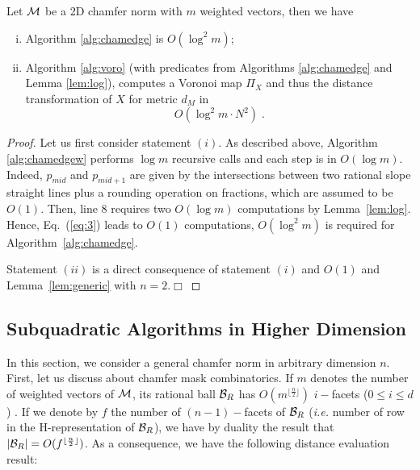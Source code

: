 \documentclass{llncs}
\begin{document}
\begin{theorem}
\label{them}
  Let $\mathcal{M}$ be a 2D chamfer norm with $m$ weighted vectors, then we
  have
  \begin{enumerate}[(i)]
  \item Algorithm     \ref{alg:chamedge} is   $O(\log^2{m})$\;;
  \item Algorithm \ref{alg:voro} (with predicates from Algorithms
    \ref{alg:chamedge} and Lemma \ref{lem:log}), computes a Voronoi
    map $\Pi_X$ and thus the distance transformation of $X$ for metric
    $d_{M}$ in
  \begin{equation}
    O( \log^2{m}\cdot N^2)\;.
  \end{equation}
  \end{enumerate}
\end{theorem}
\begin{proof}
Let us first consider statement $(i)$. As described above, Algorithm
\ref{alg:chamedgew} performs $\log{m}$ recursive calls and each step
is in $O(\log{m})$. Indeed, $p_{mid}$ and $p_{mid+1}$ are given by the
intersections between two rational slope straight lines plus a
rounding operation on fractions, which are assumed to be $O(1)$. Then,
line 8 requires two $O(\log{m})$ computations by
Lemma~\ref{lem:log}. Hence, Eq.~(\ref{eq:3}) leads to $O(1)$
computations, $O(\log^2{m})$ is required for
Algorithm~\ref{alg:chamedge}.

Statement $(ii)$ is a direct consequence of statement $(i)$ and
$O(1)$ and Lemma~\ref{lem:generic} with $n=2$.$\Box$
\end{proof}


\subsection{Subquadratic Algorithms in Higher Dimension}
\label{sec:subq-algor-high}
In this section, we consider a general chamfer norm in arbitrary
dimension $n$.  First, let us discuss about chamfer mask
combinatorics. If $m$ denotes the number of weighted vectors of $\mathcal{M}$,
its rational ball $\mathcal{B}_R$ has $O(m^{\lfloor \frac{n}{2}\rfloor})$
$i-$facets ($0 \leq i \leq d$) \cite{deberg}. If we denote by $f$ the
number of $(n-1)-$facets of $\mathcal{B}_R$ (\emph{i.e.} number of row in the
H-representation of $\mathcal{B}_R$), we have by duality the result that $|\mathcal{B}_R| =
O(f^{\lfloor \frac{n}{2}\rfloor})$. As a consequence, we have the
following distance evaluation result:
\end{document}
